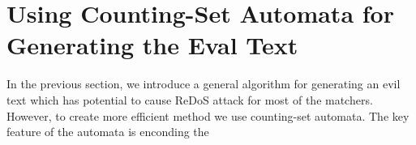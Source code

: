 \documentclass[acmsmall,screen]{acmart}
\begin{document}
\section{Using Counting-Set Automata for Generating the Eval Text}\label{sec:genText}
In the previous section, we introduce a general algorithm for generating an evil text which has potential to cause ReDoS attack for most of the matchers. 
%
However, to create more efficient method we use counting-set automata.
%
The key feature of the automata is enconding the 


%
\end{document}
